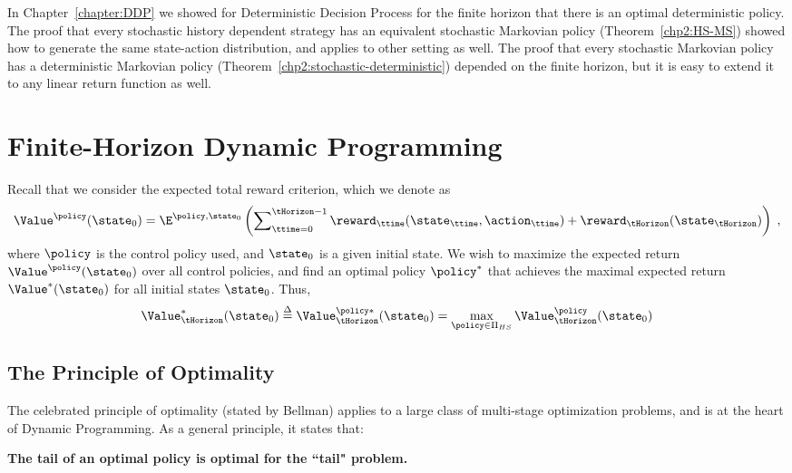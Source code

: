 
In Chapter~\ref{chapter:DDP}  we showed for Deterministic Decision
Process for the finite horizon that there is an optimal
deterministic policy. The proof that every stochastic history
dependent strategy has an equivalent stochastic Markovian policy
(Theorem~\ref{chp2:HS-MS}) showed how to generate the same
state-action distribution, and applies to other setting as well. The
proof that every stochastic Markovian policy has a deterministic
Markovian policy (Theorem~\ref{chp2:stochastic-deterministic})
depended on the finite horizon, but it is easy to extend it to any
linear return function as well.

\section{Finite-Horizon Dynamic Programming}

Recall that we consider the expected total reward criterion, which we denote as
\[{\Value^\policy }({\state_0}) = {\E^{\policy ,{\state_0}}}\left( {\sum\nolimits_{\ttime = 0}^{\tHorizon -1} {{\reward_\ttime}({\state_\ttime},{\action_\ttime}) + {\reward_\tHorizon}({\state_\tHorizon})} } \right)\;,\]
where $\policy $ is the control policy used, and ${\state_0}$ is a
given initial state. We wish to maximize the expected return
${\Value^\policy }({\state_0})$ over all control policies, and find
an optimal policy ${\policy ^*}$ that achieves the maximal expected
return ${\Value^*}({\state_0})$ for all initial states ${\state_0}$.
Thus,
\[{\Value^*_\tHorizon}({\state_0}) \buildrel \Delta \over = {\Value^{\policy *}_\tHorizon}({\state_0}) = \mathop {\max }\limits_{\policy  \in {\Pi _{HS}}} {\Value^\policy_\tHorizon }({\state_0})\]


\subsection{The Principle of Optimality}
The celebrated principle of optimality (stated by Bellman) applies
to a large class of multi-stage optimization problems, and is at the
heart of Dynamic Programming. As a general principle, it states
that:
\begin{center}
\textbf{The tail of an optimal policy is optimal for the ``tail"
problem.}
\end{center}

